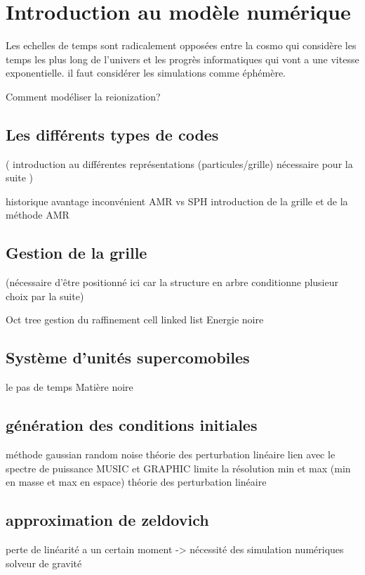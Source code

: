 \chapter{Introduction au modèle numérique}\label{ch:introduction}

Les echelles de temps sont radicalement opposées entre la cosmo qui considère les temps les plus long de l'univers et les progrès informatiques qui vont a une vitesse exponentielle. il faut considérer les simulations comme éphémère.

Comment modéliser la reionization?

\section{Les différents types de codes}

( introduction au différentes représentations (particules/grille) nécessaire pour la suite )

historique
avantage inconvénient AMR vs SPH
introduction de la grille et de la méthode AMR

\section{Gestion de la grille}

(nécessaire d'être positionné ici car la structure en arbre conditionne plusieur choix par la suite)

Oct tree
gestion du raffinement
cell linked list
Energie noire

\section{Système d'unités supercomobiles}
le pas de temps
Matière noire

\section{génération des conditions initiales}

méthode
gaussian random noise
théorie des perturbation linéaire
lien avec le spectre de puissance
MUSIC et GRAPHIC
limite la résolution min et max (min en masse et max en espace)
théorie des perturbation linéaire

\section{approximation de zeldovich}
perte de linéarité a un certain moment -> nécessité des simulation numériques
solveur de gravité

